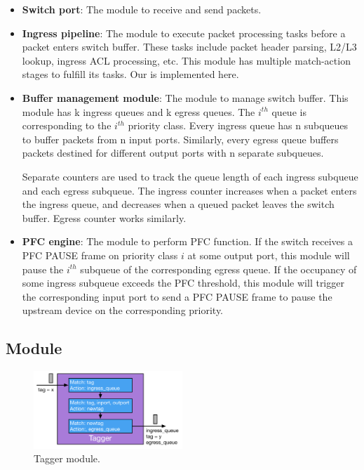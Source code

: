 \begin{itemize}
	\item \textbf{Switch port}: The module to receive and send packets.
	
	\item \textbf{Ingress pipeline}: The module to execute packet processing tasks before a packet enters switch buffer. These tasks include packet header parsing, L2/L3 lookup, ingress ACL processing, etc.  This module has multiple match-action stages to fulfill its tasks. Our \sysname{} is implemented here.
	
	\item \textbf{Buffer management module}: The module to manage switch buffer. This module has k ingress queues and k egress queues. The $i^{th}$ queue is corresponding to the $i^{th}$ priority class. Every ingress queue has n subqueues to buffer packets from n input ports. Similarly, every egress queue buffers packets destined for different output ports with n separate subqueues.
	
	Separate counters are used to track the queue length of each ingress subqueue and each egress subqueue. The ingress counter increases when a packet enters the ingress queue, and decreases when a queued packet leaves the switch buffer. Egress counter works similarly. 
	
	
	\item \textbf{PFC engine}: The module to perform PFC function. If the switch receives a PFC PAUSE frame on priority class $i$ at some output port, this module will pause the $i^{th}$ subqueue of the corresponding egress queue. If the occupancy of some ingress subqueue exceeds the PFC threshold, this module will trigger the corresponding input port to send a PFC PAUSE frame to pause the upstream device on the corresponding priority. 

\end{itemize}


\subsection{\sysname{} Module}\label{subsec:acl}

\begin{figure}
	\hspace{-0.2in}
	\centering
	\includegraphics[width=0.5\textwidth] {figs/tagger}
	\caption{Tagger module.}\label{fig:tagger}
	
\end{figure}

